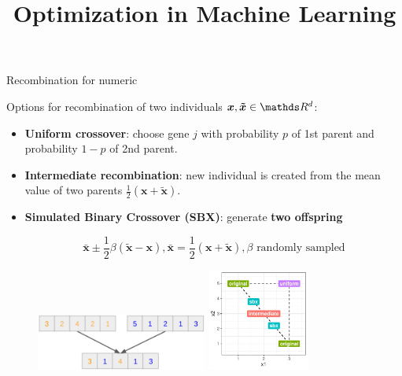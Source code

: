 \documentclass[11pt,compress,t,notes=noshow, xcolor=table]{beamer}
\title{Optimization in Machine Learning}
\date{}
\begin{document}
\sloppy

\begin{vbframe}{Recombination for numeric}

Options for recombination of two individuals $\bm{x}, \bm{\tilde x} \in \R^d$: 
\begin{itemize}
\item \textbf{Uniform crossover}: choose gene $j$ with probability $p$ of 1st parent and probability $1-p$ of 2nd parent.
\item \textbf{Intermediate recombination}: new individual is created from the mean value of two parents $\frac{1}{2}(\bm{x} + \bm{\tilde x})$.
\item \textbf{Simulated Binary Crossover (SBX)}: generate \textbf{two offspring}

$$
\bm{\bar x} \pm \frac{1}{2} \beta (\bm{\tilde x} - \bm{x}), \bm{\bar x} = \frac{1}{2} (\bm{x} + \bm{\tilde x}), \beta \text{ randomly sampled}
$$
\end{itemize}

\vspace*{-0.3cm}
\begin{figure}
  \vspace*{-0.3cm}
  \includegraphics[width=0.5\textwidth]{figure_man/ea_recombination_uniform.png}  
  \includegraphics[width=0.3\textwidth]{figure_man/ea_recombination_numeric.pdf}
\end{figure}

\end{vbframe}
\end{document}
